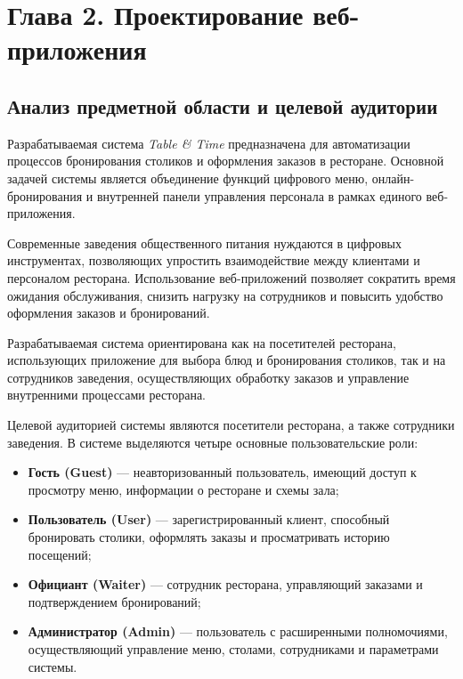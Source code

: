 \section*{Глава 2. Проектирование веб-приложения}

\subsection{Анализ предметной области и целевой аудитории}

Разрабатываемая система \textit{Table \& Time} предназначена для автоматизации
процессов бронирования столиков и оформления заказов в ресторане.
Основной задачей системы является объединение функций цифрового меню,
онлайн-бронирования и внутренней панели управления персонала в рамках
единого веб-приложения.

Современные заведения общественного питания нуждаются в цифровых
инструментах, позволяющих упростить взаимодействие между клиентами
и персоналом ресторана. Использование веб-приложений позволяет
сократить время ожидания обслуживания, снизить нагрузку на сотрудников
и повысить удобство оформления заказов и бронирований.

Разрабатываемая система ориентирована как на посетителей ресторана,
использующих приложение для выбора блюд и бронирования столиков,
так и на сотрудников заведения, осуществляющих обработку заказов
и управление внутренними процессами ресторана.

Целевой аудиторией системы являются посетители ресторана, а также сотрудники
заведения. В системе выделяются четыре основные пользовательские роли:

\begin{itemize}
	\item \textbf{Гость (Guest)} --- неавторизованный пользователь, имеющий
	      доступ к просмотру меню, информации о ресторане и схемы зала;
	\item \textbf{Пользователь (User)} --- зарегистрированный клиент,
	      способный бронировать столики, оформлять заказы и просматривать историю
	      посещений;
	\item \textbf{Официант (Waiter)} --- сотрудник ресторана, управляющий
	      заказами и подтверждением бронирований;
	\item \textbf{Администратор (Admin)} --- пользователь с расширенными
	      полномочиями, осуществляющий управление меню, столами, сотрудниками
	      и параметрами системы.
\end{itemize}

